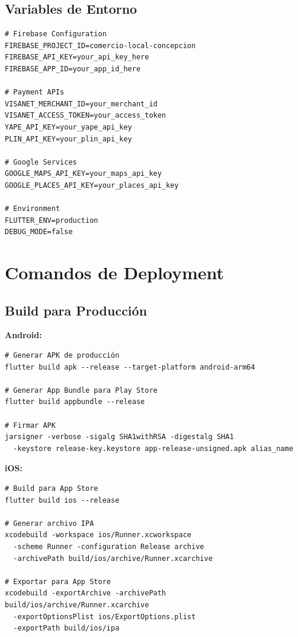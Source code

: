 \documentclass[12pt,a4paper]{report}
\begin{document}
\subsection{Variables de Entorno}

\begin{verbatim}
# Firebase Configuration
FIREBASE_PROJECT_ID=comercio-local-concepcion
FIREBASE_API_KEY=your_api_key_here
FIREBASE_APP_ID=your_app_id_here

# Payment APIs
VISANET_MERCHANT_ID=your_merchant_id
VISANET_ACCESS_TOKEN=your_access_token
YAPE_API_KEY=your_yape_api_key
PLIN_API_KEY=your_plin_api_key

# Google Services
GOOGLE_MAPS_API_KEY=your_maps_api_key
GOOGLE_PLACES_API_KEY=your_places_api_key

# Environment
FLUTTER_ENV=production
DEBUG_MODE=false
\end{verbatim}

\section{Comandos de Deployment}

\subsection{Build para Producción}

\textbf{Android:}
\begin{verbatim}
# Generar APK de producción
flutter build apk --release --target-platform android-arm64

# Generar App Bundle para Play Store
flutter build appbundle --release

# Firmar APK
jarsigner -verbose -sigalg SHA1withRSA -digestalg SHA1 
  -keystore release-key.keystore app-release-unsigned.apk alias_name
\end{verbatim}

\textbf{iOS:}
\begin{verbatim}
# Build para App Store
flutter build ios --release

# Generar archivo IPA
xcodebuild -workspace ios/Runner.xcworkspace 
  -scheme Runner -configuration Release archive 
  -archivePath build/ios/archive/Runner.xcarchive

# Exportar para App Store
xcodebuild -exportArchive -archivePath build/ios/archive/Runner.xcarchive 
  -exportOptionsPlist ios/ExportOptions.plist 
  -exportPath build/ios/ipa
\end{verbatim}
\end{document}
